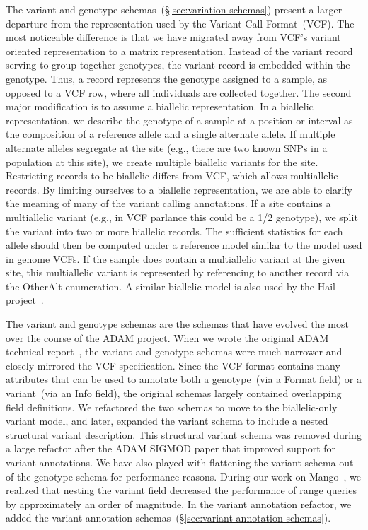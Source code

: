 \documentclass[phd]{ucbthesis}
\begin{document}
The variant and genotype schemas~(\S\ref{sec:variation-schemas}) present a larger departure from the representation used by the Variant Call
Format~({VCF}). The most noticeable difference is that we have migrated away from {VCF}'s variant oriented
representation to a matrix representation. Instead of the variant record serving to group together genotypes, the
variant record is embedded within the genotype. Thus, a record represents the genotype assigned to a sample,
as opposed to a {VCF} row, where all individuals are collected together. The second major modification is to assume
a biallelic representation. In a biallelic representation, we describe the genotype of a sample at a position or
interval as the composition of a reference allele and a single alternate allele. If multiple alternate alleles segregate at
the site (e.g., there are two known SNPs in a population at this site), we create multiple biallelic variants for the site.
Restricting records to be biallelic differs from {VCF}, which allows multiallelic records. By limiting
ourselves to a biallelic representation, we are able to clarify the meaning of many of the variant calling annotations. If a
site contains a multiallelic variant (e.g., in {VCF} parlance this could be a {1/2} genotype), we split the
variant into two or more biallelic records. The sufficient statistics for each allele should then be computed under
a reference model similar to the model used in genome {VCF}s. If the sample does contain a multiallelic variant at
the given site, this multiallelic variant is represented by referencing to another record via the {OtherAlt}
enumeration. A similar biallelic model is also used by the {Hail} project~\cite{hail}.

The variant and genotype schemas are the schemas that have evolved the most
over the course of the {ADAM} project. When we wrote the original
{ADAM} technical report~\cite{massie13}, the variant and genotype schemas
were much narrower and closely mirrored the {VCF} specification.
Since the VCF format contains many attributes that can be used to annotate both
a genotype~(via a {Format} field) or a variant~(via an {Info}
field), the original schemas largely contained overlapping field definitions.
We refactored the two schemas to move to the biallelic-only variant model, and
later, expanded the variant schema to include a nested structural variant
description. This structural variant schema was removed during a large refactor
after the ADAM SIGMOD paper that improved support for variant annotations. We
have also played with flattening the variant schema out of the genotype schema
for performance reasons. During our work on {Mango}~\cite{tu16, morrow17},
we realized that nesting the variant field decreased the performance of range
queries by approximately an order of magnitude. In the variant annotation
refactor, we added the variant annotation schemas~(\S\ref{sec:variant-annotation-schemas}).
\end{document}
